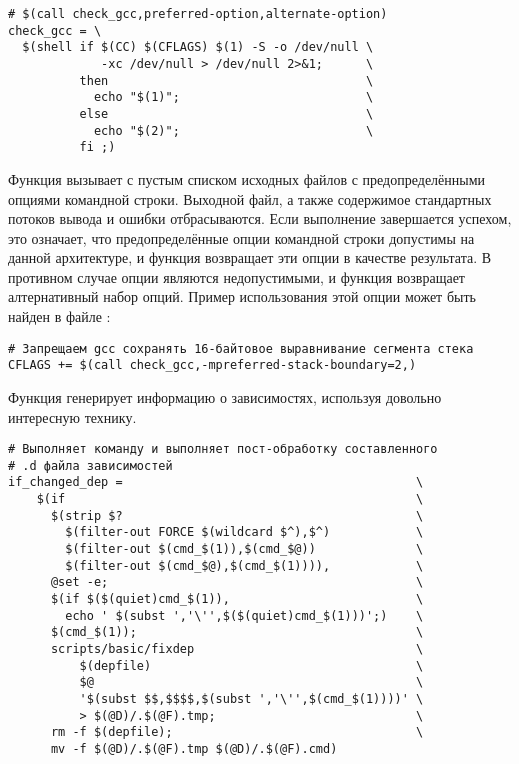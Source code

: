 \begin{verbatim}
# $(call check_gcc,preferred-option,alternate-option)
check_gcc = \
  $(shell if $(CC) $(CFLAGS) $(1) -S -o /dev/null \
             -xc /dev/null > /dev/null 2>&1;      \
          then                                    \
            echo "$(1)";                          \
          else                                    \
            echo "$(2)";                          \
          fi ;)
\end{verbatim}

Функция вызывает \utility{gcc} с пустым списком исходных файлов
с предопределёнными опциями командной строки. Выходной файл,
а также содержимое стандартных потоков вывода и ошибки отбрасываются.
Если выполнение \utility{gcc} завершается успехом, это означает, что
предопределённые опции командной строки допустимы на данной архитектуре,
и функция возвращает эти опции в качестве результата. В противном
случае опции являются недопустимыми, и функция возвращает алтернативный
набор опций. Пример использования этой опции может быть найден в файле
\filename{arch/i386/Makefile}:

\begin{verbatim}
# Запрещаем gcc сохранять 16-байтовое выравнивание сегмента стека
CFLAGS += $(call check_gcc,-mpreferred-stack-boundary=2,)
\end{verbatim}

Функция  генерирует информацию о
зависимостях, используя довольно интересную технику.

\begin{verbatim}
# Выполняет команду и выполняет пост-обработку составленного
# .d файла зависимостей
if_changed_dep =                                         \
    $(if                                                 \
      $(strip $?                                         \
        $(filter-out FORCE $(wildcard $^),$^)            \
        $(filter-out $(cmd_$(1)),$(cmd_$@))              \
        $(filter-out $(cmd_$@),$(cmd_$(1)))),            \
      @set -e;                                           \
      $(if $($(quiet)cmd_$(1)),                          \
        echo ' $(subst ','\'',$($(quiet)cmd_$(1)))';)    \
      $(cmd_$(1));                                       \
      scripts/basic/fixdep                               \
          $(depfile)                                     \
          $@                                             \
          '$(subst $$,$$$$,$(subst ','\'',$(cmd_$(1))))' \
          > $(@D)/.$(@F).tmp;                            \
      rm -f $(depfile);                                  \
      mv -f $(@D)/.$(@F).tmp $(@D)/.$(@F).cmd)
\end{verbatim}

